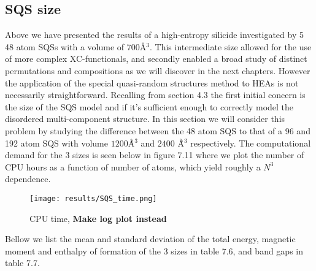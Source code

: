 \newpage
\subsection{SQS size}
Above we have presented the results of a high-entropy silicide  investigated by 5 48 atom SQSs with a volume of $700$\r{A}$^3$. This intermediate size allowed for the use of more complex XC-functionals, and secondly enabled a broad study of distinct permutations and compositions as we will discover in the next chapters. However the application of the special quasi-random structures method to HEAs is not necessarily straightforward. Recalling from section 4.3 the first initial concern is the size of the SQS model and if it's sufficient enough to correctly model the disordered multi-component structure. In this section we will consider this problem by studying the difference between the 48 atom SQS to that of a 96 and 192 atom SQS with volume $1200$\r{Å}$^3$ and $2400$ \r{Å}$^3$ respectively. The computational demand for the 3 sizes is seen below in figure 7.11 where we plot the number of CPU hours as a function of number of atoms, which yield roughly a $N^3$ dependence. 

\begin{figure}[H]
\centering
\texttt{[image: results/SQS\_time.png]}
\caption{CPU time, \textbf{Make log plot instead}}
\end{figure}

Bellow we list the mean and standard deviation of the total energy, magnetic moment and enthalpy of formation of the 3 sizes in table 7.6, and band gaps in table 7.7. 

